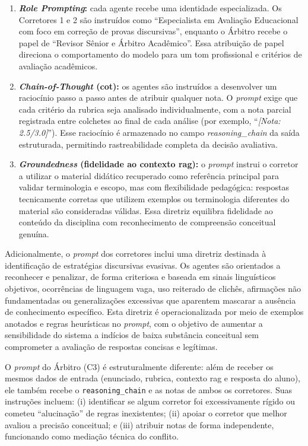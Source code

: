 \begin{enumerate}
    \item \textbf{\textit{Role Prompting}:} cada agente recebe uma identidade especializada. Os Corretores 1 e 2 são instruídos como ``Especialista em Avaliação Educacional com foco em correção de provas discursivas'', enquanto o Árbitro recebe o papel de ``Revisor Sênior e Árbitro Acadêmico''. Essa atribuição de papel direciona o comportamento do modelo para um tom profissional e critérios de avaliação acadêmicos.

    \item \textbf{\textit{Chain-of-Thought} (\gls{cot}):} os agentes são instruídos a desenvolver um raciocínio passo a passo antes de atribuir qualquer nota. O \textit{prompt} exige que cada critério da rubrica seja analisado individualmente, com a nota parcial registrada entre colchetes ao final de cada análise (por exemplo, ``\textit{[Nota: 2.5/3.0]}''). Esse raciocínio é armazenado no campo \textit{reasoning\_chain} da saída estruturada, permitindo rastreabilidade completa da decisão avaliativa.

    \item \textbf{\textit{Groundedness} (fidelidade ao contexto \gls{rag}):} o \textit{prompt} instrui o corretor a utilizar o material didático recuperado como referência principal para validar terminologia e escopo, mas com flexibilidade pedagógica: respostas tecnicamente corretas que utilizem exemplos ou terminologia diferentes do material são consideradas válidas. Essa diretriz equilibra fidelidade ao conteúdo da disciplina com reconhecimento de compreensão conceitual genuína.
\end{enumerate}

Adicionalmente, o \textit{prompt} dos corretores inclui uma diretriz destinada à identificação de estratégias discursivas evasivas. Os agentes são orientados a reconhecer e penalizar, de forma criteriosa e baseada em sinais linguísticos objetivos, ocorrências de linguagem vaga, uso reiterado de clichês, afirmações não fundamentadas ou generalizações excessivas que aparentem mascarar a ausência de conhecimento específico. Esta diretriz é operacionalizada por meio de exemplos anotados e regras heurísticas no \textit{prompt}, com o objetivo de aumentar a sensibilidade do sistema a indícios de baixa substância conceitual sem comprometer a avaliação de respostas concisas e legítimas.

O \textit{prompt} do Árbitro (C3) é estruturalmente diferente: além de receber os mesmos dados de entrada (enunciado, rubrica, contexto \gls{rag} e resposta do aluno), ele também recebe o \texttt{reasoning\_chain} e as notas de ambos os corretores. Suas instruções incluem: (i) identificar se algum corretor foi excessivamente rígido ou cometeu ``alucinação'' de regras inexistentes; (ii) apoiar o corretor que melhor avaliou a precisão conceitual; e (iii) atribuir notas de forma independente, funcionando como mediação técnica do conflito.

